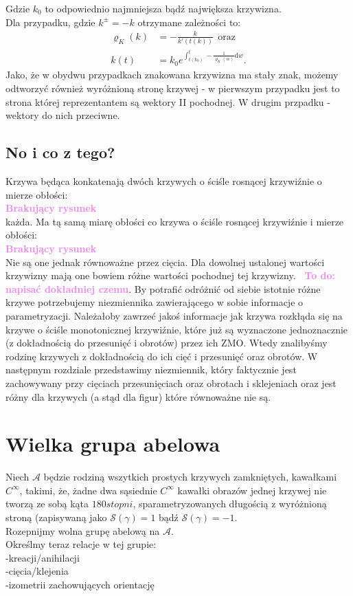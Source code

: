 \documentclass[a4paper, 12pt]{article}
\newcommand{\smalltodoII}[1]{\hfill \break \textbf{\ \textcolor{violet}{To do: #1}}\hfill \break}
\newcommand{\rysunek}[1]{\hfill \break\\[16pt] \Huge \textbf{\textcolor{violet}{Brakujący rysunek \normalsize
#1}} \hfill
\break \\[16pt] \normalsize}
\begin{document}
Gdzie $k_0$ to odpowiednio najmniejsza bądź największa krzywizna. \\
Dla przypadku, gdzie $k^\pm = -k$ otrzymane zależności to:
\begin{align}
    \varrho_K(k) &= -\frac{k}{k'(t(k))}\ \
    \textrm{oraz} \\
    k(t) &= k_0e^{\int_{t(k_0)}^{t}-\frac{1}{\varrho_K(w)}\text{d}w}.
\end{align}
Jako, że w obydwu przypadkach znakowana krzywizna ma stały znak, możemy odtworzyć również wyróżnioną stronę
krzywej - w pierwszym przypadku jest to strona której reprezentantem są wektory II pochodnej. W drugim
przpadku - wektory do nich przeciwne. \\

\subsection{No i co z tego?}
Krzywa będąca konkatenają dwóch krzywych o ściśle rosnącej krzywiźnie o mierze obłości:
\rysunek{}
każda. Ma tą samą miarę obłości co krzywa o ściśle rosnącej krzywiźnie i mierze obłości:
\rysunek{}
Nie są one jednak równoważne przez cięcia. Dla dowolnej ustalonej wartości krzywizny mają one bowiem różne
wartości pochodnej tej krzywizny. \smalltodoII{napisać dokładniej czemu}.
By potrafić odróżnić od siebie istotnie różne krzywe potrzebujemy niezmiennika zawierającego w sobie
informacje o parametryzacji. Należałoby zawrzeć jakoś informacje jak krzywa rozkłąda się na krzywe o ściśle
monotonicznej krzywiźnie, które już są wyznaczone jednoznacznie (z dokładnością do przesunięć i
obrotów) przez ich ZMO.
Wtedy znalibyśmy rodzinę krzywych z dokładnością do ich cięć i przesunięć oraz obrotów.
W następnym rozdziale przedstawimy niezmiennik, który faktycznie jest zachowywany przy cięciach
przesunięciach oraz obrotach i
 sklejeniach oraz jest różny dla krzywych (a stąd dla figur) które równoważne nie są.

\section{Wielka grupa abelowa}
Niech $\mathcal{A}$ będzie rodziną wszytkich
prostych krzywych
zamkniętych, kawałkami $C^\infty$, takimi, że, żadne dwa sąsiednie $C^\infty$ kawałki obrazów jednej krzywej
nie tworzą ze sobą kąta $180 stopni$, sparametryzowanych długością z wyróżnioną stroną
(zapisywaną jako $\mathcal{S}(\gamma) = 1$ bądź $\mathcal{S}(\gamma)=-1$. \\
Rozepnijmy wolna grupę abelową na $\mathcal{A}$. \\
Określmy teraz relacje w tej grupie: \\
-kreacji/anihilacji \\
-cięcia/klejenia \\
-izometrii zachowujących orientację \\
\end{document}

